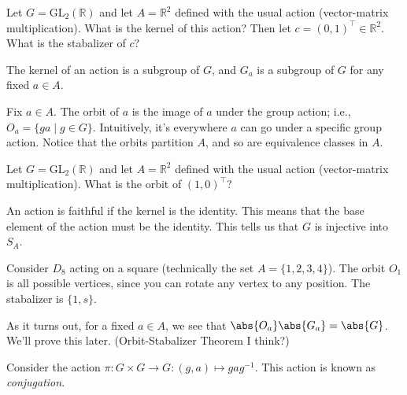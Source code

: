 \begin{example}
Let $G = \mathrm{GL}_2(\mathbb{R})$ and let $A = \mathbb{R}^2$ defined with the usual action (vector-matrix multiplication). What is the kernel of this action? Then let $c = (0,1)^\top \in \mathbb{R}^2$. What is the stabalizer of $c$?
\end{example}

\begin{corollary}
The kernel of an action is a subgroup of $G$, and $G_a$ is a subgroup of $G$ for any fixed $a \in A$.
\end{corollary}

\begin{definition}[Orbit]
Fix $a \in A$. The orbit of $a$ is the image of $a$ under the group action; i.e., $O_a = \{ga \mid g \in G\}$. Intuitively, it's everywhere $a$ can go under a specific group action. Notice that the orbits partition $A$, and so are equivalence classes in $A$.
\end{definition}

\begin{example}
Let $G = \mathrm{GL}_2(\mathbb{R})$ and let $A = \mathbb{R}^2$ defined with the usual action (vector-matrix multiplication). What is the orbit of $(1,0)^\top$?
\end{example}

\begin{definition}[Faithful]
An action is faithful if the kernel is the identity. This means that the base element of the action must be the identity. This tells us that $G$ is injective into $S_A$.
\end{definition}

\begin{example}
Consider $D_8$ acting on a square (technically the set $A = \{1,2,3,4\}$). The orbit $O_1$ is all possible vertices, since you can rotate any vertex to any position. The stabalizer is $\{1, s\}$.
\end{example}

\begin{lemma}
As it turns out, for a fixed $a \in A$, we see that $\abs{O_a}\abs{G_a} = \abs{G}$. We'll prove this later. (Orbit-Stabalizer Theorem I think?)
\end{lemma}

\begin{definition}[Conjugation]
Consider the action $\pi : G \times G \to G : (g,a) \mapsto gag^{-1}$. This action is known as \emph{conjugation}.
\end{definition}

